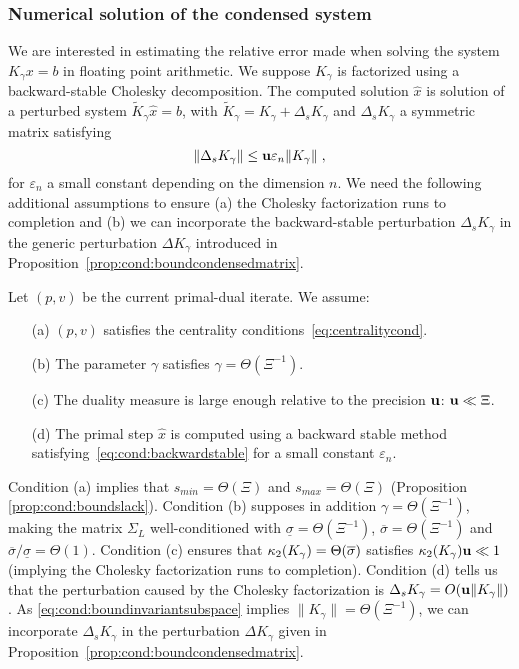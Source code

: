 \subsubsection{Numerical solution of the condensed system}
We are interested in estimating the relative error
made when solving the system $K_\gamma x = b$ in floating
point arithmetic. We suppose $K_\gamma$ is factorized using
a backward-stable Cholesky decomposition. The computed
solution $\widehat{x}$ is solution of a perturbed system
$\widetilde{K}_\gamma \widehat{x} = b$, with $\widetilde{K}_\gamma
= K_\gamma + \Delta_s K_\gamma$ and $\Delta_s K_\gamma$ a symmetric matrix satisfying
\begin{equation}
  \label{eq:cond:backwardstable}
  \|\Delta_s K_\gamma\| \leq \mathbf{u} \varepsilon_n \|K_\gamma\| \;,
\end{equation}
for $\varepsilon_n$ a small constant depending on the dimension $n$.
We need the following additional assumptions to
ensure (a) the Cholesky factorization runs to completion
and (b) we can incorporate the backward-stable perturbation $\Delta_s K_\gamma$
in the generic perturbation $\Delta K_\gamma$ introduced in
Proposition~\ref{prop:cond:boundcondensedmatrix}.
\begin{assumption} Let $(p, v)$ be the current primal-dual iterate. We assume:
  \begin{itemize}
    \item[(a)] $(p, v)$ satisfies the centrality conditions~\eqref{eq:centralitycond}.
    \item[(b)] The parameter $\gamma$ satisfies $\gamma = \Theta(\Xi^{-1})$.
    \item[(c)] The duality measure is large enough relative to the precision $\mathbf{u}$: $\mathbf{u} \ll \Xi$.
    \item[(d)] The primal step $\widehat{x}$ is computed using a backward
      stable method satisfying~\eqref{eq:cond:backwardstable} for a small constant
      $\varepsilon_n$.
  \end{itemize}
  \label{hyp:cond:wellcond}
\end{assumption}
Condition (a) implies that
$s_{min} = \Theta(\Xi)$ and $s_{max} = \Theta(\Xi)$ (Proposition \ref{prop:cond:boundslack}).
Condition (b) supposes in addition $\gamma = \Theta(\Xi^{-1})$, making
the matrix $\Sigma_L$ well-conditioned with
$\underline{\sigma} = \Theta(\Xi^{-1})$,
$\overline{\sigma} = \Theta(\Xi^{-1})$ and $\overline{\sigma}/\underline{\sigma} = \Theta(1)$.
Condition (c) ensures that $\kappa_2(K_\gamma) = \Theta(\overline{\sigma})$
satisfies $\kappa_2(K_\gamma) \mathbf{u} \ll 1$
(implying the Cholesky factorization runs to completion).
Condition (d) tells us that the perturbation caused by the Cholesky
factorization is $\Delta_s K_\gamma = O(\mathbf{u} \| K_\gamma\|)$. As
\eqref{eq:cond:boundinvariantsubspace} implies $\|K_\gamma \| = \Theta(\Xi^{-1})$,
we can incorporate $\Delta_s K_\gamma$ in the perturbation
$\Delta K_\gamma$ given in Proposition~\ref{prop:cond:boundcondensedmatrix}.

